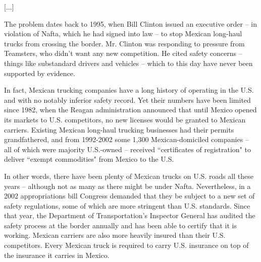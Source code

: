 \documentclass[letterpaper,12pt]{article}
\begin{document}


[...]


The problem dates back to 1995, when Bill Clinton issued an 
executive order -- in violation of Nafta, which he had signed into 
law -- to stop Mexican long-haul trucks from crossing the border. 
Mr. Clinton was responding to pressure from Teamsters, who didn't 
want any new competition. He cited safety concerns -- things like 
substandard drivers and vehicles -- which to this day have never 
been supported by evidence.

In fact, Mexican trucking companies have a long history of operating 
in the U.S. and with no notably inferior safety record. Yet their 
numbers have been limited since 1982, when the Reagan administration 
announced that until Mexico opened its markets to U.S. competitors, 
no new licenses would be granted to Mexican carriers. Existing 
Mexican long-haul trucking businesses had their permits 
grandfathered, and from 1992-2002 some 1,300 Mexican-domiciled 
companies -- all of which were majority U.S.-owned -- received 
``certificates of registration" to deliver ``exempt commodities" 
from Mexico to the U.S.

In other words, there have been plenty of Mexican trucks on U.S. 
roads all these years -- although not as many as there might be 
under Nafta. Nevertheless, in a 2002 appropriations bill Congress 
demanded that they be subject to a new set of safety regulations, 
some of which are more stringent than U.S. standards. Since that 
year, the Department of Transportation's Inspector General has 
audited the safety process at the border annually and has been able 
to certify that it is working. Mexican carriers are also more 
heavily insured than their U.S. competitors. Every Mexican truck is 
required to carry U.S. insurance on top of the insurance it carries 
in Mexico.
\end{document}
